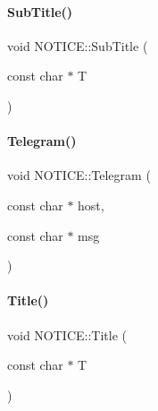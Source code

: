 \mbox{\label{namespace_n_o_t_i_c_e_a483b62c015a4211e2716f730ad2c0a44}} 
\paragraph{\texorpdfstring{Sub\+Title()}{SubTitle()}}
{\footnotesize\ttfamily void N\+O\+T\+I\+C\+E\+::\+Sub\+Title (\begin{DoxyParamCaption}\item[{const char $\ast$}]{T }\end{DoxyParamCaption})\hspace{0.3cm}{\ttfamily [inline]}}

\mbox{\label{namespace_n_o_t_i_c_e_a7f45e7bbaeb797160d77c7c5dbbb37a6}} 
\paragraph{\texorpdfstring{Telegram()}{Telegram()}}
{\footnotesize\ttfamily void N\+O\+T\+I\+C\+E\+::\+Telegram (\begin{DoxyParamCaption}\item[{const char $\ast$}]{host,  }\item[{const char $\ast$}]{msg }\end{DoxyParamCaption})\hspace{0.3cm}{\ttfamily [inline]}}

\mbox{\label{namespace_n_o_t_i_c_e_a0ddfb0ca7dfa968616d34f4752368bba}} 
\paragraph{\texorpdfstring{Title()}{Title()}}
{\footnotesize\ttfamily void N\+O\+T\+I\+C\+E\+::\+Title (\begin{DoxyParamCaption}\item[{const char $\ast$}]{T }\end{DoxyParamCaption})\hspace{0.3cm}{\ttfamily [inline]}}



